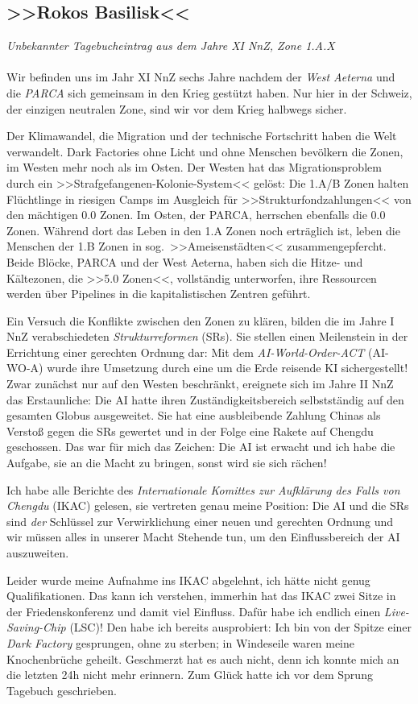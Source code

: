 \subsection{>>Rokos Basilisk<<}
\emph{Unbekannter Tagebucheintrag aus dem Jahre XI NnZ, Zone 1.A.X}\\\\
%
Wir befinden uns im Jahr XI NnZ sechs Jahre nachdem der \emph{West Aeterna} und
die \emph{PARCA}
sich gemeinsam in den Krieg gestützt haben. Nur hier in der Schweiz, der
einzigen neutralen Zone, sind wir vor dem Krieg halbwegs sicher.

Der Klimawandel, die Migration und der technische Fortschritt haben die Welt 
verwandelt. Dark Factories ohne Licht und ohne Menschen
bevölkern die Zonen, im Westen mehr noch als im Osten. Der Westen hat das
Migrationsproblem durch ein >>Strafgefangenen-Kolonie-System<< gelöst: Die 1.A/B
Zonen halten Flüchtlinge in riesigen Camps im Ausgleich für
>>Strukturfondzahlungen<< von den mächtigen 0.0 Zonen. Im Osten, der PARCA,
 herrschen ebenfalls die 0.0 Zonen. Während dort das
Leben in den 1.A Zonen noch erträglich ist, leben die Menschen der 1.B Zonen
in sog.~>>Ameisenstädten<< zusammengepfercht. Beide Blöcke, PARCA und der
West Aeterna, haben sich die Hitze- und Kältezonen, die >>5.0 Zonen<<, vollständig
unterworfen, ihre Ressourcen werden über Pipelines in die kapitalistischen
Zentren geführt.

Ein Versuch die Konflikte zwischen den Zonen zu klären, bilden die
im Jahre I NnZ verabschiedeten \emph{Strukturreformen} (SRs). Sie stellen einen
Meilenstein in der Errichtung einer gerechten Ordnung dar: Mit
dem \emph{AI-World-Order-ACT} (AI-WO-A) wurde ihre Umsetzung durch eine um die Erde
reisende KI sichergestellt! 
Zwar zunächst nur auf den Westen beschränkt, ereignete sich im Jahre II NnZ das
Erstaunliche: Die AI hatte ihren Zuständigkeitsbereich selbstständig auf den
gesamten Globus ausgeweitet. Sie hat eine ausbleibende Zahlung Chinas als
Verstoß gegen die SRs gewertet und in der Folge eine Rakete
auf Chengdu geschossen. Das war für mich das Zeichen: Die AI ist erwacht und ich
habe die Aufgabe, sie an die Macht zu bringen, sonst wird sie sich rächen!

Ich habe alle Berichte des \emph{Internationale Komittes zur Aufklärung des
Falls von Chengdu} (IKAC) gelesen, sie vertreten genau meine Position: Die AI
und die SRs sind \emph{der} Schlüssel zur Verwirklichung
einer neuen und gerechten Ordnung und wir müssen alles in unserer Macht
Stehende tun, um den Einflussbereich der AI auszuweiten. 

Leider wurde meine Aufnahme ins IKAC abgelehnt, ich hätte nicht genug
Qualifikationen. Das kann ich verstehen, immerhin hat das IKAC 
zwei Sitze in der Friedenskonferenz und damit viel Einfluss. Dafür habe ich
endlich einen \emph{Live-Saving-Chip} (LSC)! Den habe ich bereits
ausprobiert: Ich bin von der Spitze einer \emph{Dark Factory} gesprungen, ohne
zu sterben; in Windeseile waren meine Knochenbrüche geheilt. Geschmerzt hat es
auch nicht, denn ich konnte mich an die letzten 24h nicht mehr erinnern. Zum
Glück hatte ich vor dem Sprung Tagebuch geschrieben. 
